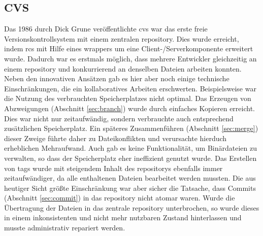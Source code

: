 \subsection{CVS}\label{sec:cvs}
Das 1986 durch Dick Grune veröffentlichte \acrfull{cvs} war das erste freie
Versionskontrollsystem mit einem zentralen \gls{repository}. Dies wurde
erreicht, indem \acrshort{rcs} mit Hilfe eines \glspl{wrapper} um eine
Client-/Serverkomponente erweitert wurde. Dadurch war es erstmals möglich, dass
mehrere Entwickler gleichzeitig an einem \gls{repository} und konkurrierend an
denselben Dateien arbeiten konnten. Neben den innovativen Ansätzen gab es hier
aber noch einige technische Einschränkungen, die ein kollaboratives Arbeiten
erschwerten. Beispielsweise war die Nutzung des verbrauchten Speicherplatzes
nicht optimal. Das Erzeugen von Abzweigungen (Abschnitt \ref{sec:branch}) wurde
durch einfaches Kopieren erreicht. Dies war nicht nur zeitaufwändig, sondern
verbrauchte auch entsprechend zusätzlichen Speicherplatz. Ein späteres
Zusammenführen (Abschnitt \ref{sec:merge}) dieser Zweige führte daher zu
Dateikonflikten und verursachte hierduch erheblichen Mehraufwand. Auch gab es
keine Funktionalität, um Binärdateien zu verwalten, so dass der Speicherplatz
eher ineffizient genutzt wurde. Das Erstellen von \glspl{tag} wurde mit
steigendem Inhalt des \glspl{repository} ebenfalls immer zeitaufwändiger, da
alle enthaltenen Dateien bearbeitet werden mussten. Die aus heutiger Sicht
größte Einschränkung war aber sicher die Tatsache, dass Commits (Abschnitt
\ref{sec:commit}) in das \gls{repository} nicht atomar waren. Wurde die
Übertragung der Dateien in das zentrale \gls{repository} unterbrochen, so wurde
dieses in einem inkonsistenten und nicht mehr nutzbaren Zustand hinterlassen
und musste administrativ repariert werden. \cite[S.~382-383]{cd}

